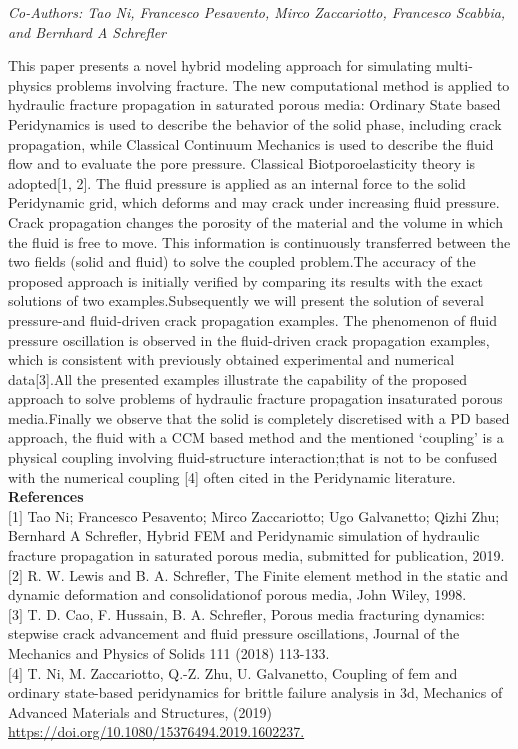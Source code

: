 \begin{center}
\textit{Co-Authors: Tao Ni, Francesco Pesavento, Mirco Zaccariotto, Francesco Scabbia, and Bernhard A Schrefler}
\end{center} 
This paper presents a novel hybrid modeling approach for simulating multi-physics problems involving fracture. The new computational method is applied to hydraulic fracture propagation in saturated porous media: Ordinary State based Peridynamics is used to describe the behavior of the solid phase, including crack propagation, while Classical Continuum Mechanics is used to describe the fluid flow and to evaluate the pore pressure. Classical Biotporoelasticity theory is adopted[1, 2]. The fluid pressure is applied as an internal force to the solid Peridynamic grid, which deforms and may crack under increasing fluid pressure. Crack propagation changes the porosity of the material and the volume in which the fluid is free to move. This information is continuously transferred between the two fields (solid and fluid) to solve the coupled problem.The accuracy of the proposed approach is initially verified by comparing its results with the exact solutions of two examples.Subsequently we will present the solution of several pressure-and fluid-driven crack propagation examples. The phenomenon of fluid pressure oscillation is observed in the fluid-driven crack propagation examples, which is consistent with previously obtained experimental and numerical data[3].All the presented examples illustrate the capability of the proposed approach to solve problems of hydraulic fracture propagation insaturated porous media.Finally we observe that the solid is completely discretised with a PD based approach, the fluid with a CCM based method and the mentioned ‘coupling’ is a physical coupling involving fluid-structure interaction;that is not to be confused with the numerical coupling [4] often cited in the Peridynamic literature.\\

\noindent\textbf{References}\\
$[$1$]$ Tao Ni; Francesco Pesavento; Mirco Zaccariotto; Ugo Galvanetto; Qizhi Zhu; Bernhard A Schrefler, Hybrid FEM and Peridynamic simulation of hydraulic fracture propagation in saturated porous media, submitted for publication, 2019.\\
$[$2$]$ R. W. Lewis and B. A. Schrefler, The Finite element method in the static and dynamic deformation and consolidationof porous media, John Wiley, 1998.\\
$[$3$]$ T. D. Cao, F. Hussain, B. A. Schrefler, Porous media fracturing dynamics: stepwise crack advancement and fluid pressure oscillations, Journal of the Mechanics and Physics of Solids 111 (2018) 113-133.\\
$[$4$]$ T. Ni, M. Zaccariotto, Q.-Z. Zhu, U. Galvanetto, Coupling of fem and ordinary state-based peridynamics for brittle failure analysis in 3d, Mechanics of Advanced Materials and Structures, (2019) \url{https://doi.org/10.1080/15376494.2019.1602237.}
